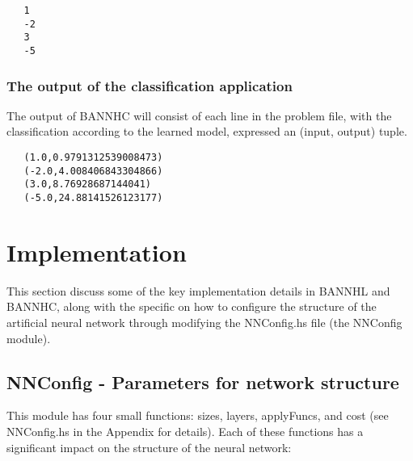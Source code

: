 \documentclass[a4paper]{article}
\newenvironment{code}{\captionsetup{type=listing}}{}
\begin{document}
\pagebreak

\begin{code}
   \begin{verbatim}
   1
   -2
   3
   -5
   \end{verbatim}
\end{code}

\subsubsection{The output of the classification application}
The output of BANNHC will consist of each line in the problem file, with the
classification according to the learned model, expressed an (input, output) 
tuple.

\begin{code}
   \begin{verbatim}
   (1.0,0.9791312539008473)
   (-2.0,4.008406843304866)
   (3.0,8.76928687144041)
   (-5.0,24.88141526123177)
   \end{verbatim}
\end{code}

\section{Implementation} \label{implementation}
This section discuss some of the key implementation details in
BANNHL and BANNHC, along with the specific on how to configure the 
structure of the artificial neural network through modifying the 
NNConfig.hs file (the NNConfig module). 
\subsection{NNConfig - Parameters for network structure}
This module has four small functions: sizes, layers, applyFuncs, and cost
(see NNConfig.hs in the Appendix for details). Each of these functions
has a significant impact on the structure of the neural network:
\end{document}
